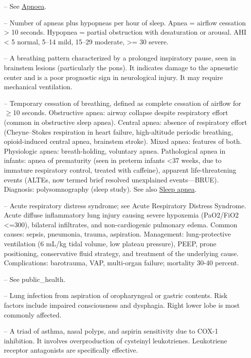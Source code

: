 -- See \hyperlink{Apnoea}{Apnoea}.

-- Number of apneas plus hypopneas per hour of sleep. Apnea = airflow cessation > 10 seconds. Hypopnea = partial obstruction with desaturation or arousal. AHI < 5 normal, 5--14 mild, 15--29 moderate, >= 30 severe.

-- A breathing pattern characterized by a prolonged inspiratory pause, seen in brainstem lesions (particularly the pons). It indicates damage to the apneustic center and is a poor prognostic sign in neurological injury. It may require mechanical ventilation.

-- Temporary cessation of breathing, defined as complete cessation of airflow for \(\ge\)10 seconds. Obstructive apnea: airway collapse despite respiratory effort (common in obstructive sleep apnea). Central apnea: absence of respiratory effort (Cheyne–Stokes respiration in heart failure, high-altitude periodic breathing, opioid-induced central apnea, brainstem stroke). Mixed apnea: features of both. Physiologic apnea: breath-holding, voluntary apnea. Pathological apnea in infants: apnea of prematurity (seen in preterm infants <37 weeks, due to immature respiratory control, treated with caffeine), apparent life-threatening events (ALTEs, now termed brief resolved unexplained events—BRUE). Diagnosis: polysomnography (sleep study). See also \hyperlink{Sleep Apnea}{Sleep apnea}.

-- Acute respiratory distress syndrome; see Acute Respiratory Distress Syndrome. Acute diffuse inflammatory lung injury causing severe hypoxemia (PaO2/FiO2 <=300), bilateral infiltrates, and non-cardiogenic pulmonary edema. Common causes: sepsis, pneumonia, trauma, aspiration. Management: lung-protective ventilation (6 mL/kg tidal volume, low plateau pressure), PEEP, prone positioning, conservative fluid strategy, and treatment of the underlying cause. Complications: barotrauma, VAP, multi-organ failure; mortality 30-40 percent.

-- See public\_health.

-- Lung infection from aspiration of oropharyngeal or gastric contents. Risk factors include impaired consciousness and dysphagia. Right lower lobe is most commonly affected.

-- A triad of asthma, nasal polyps, and aspirin sensitivity due to COX-1 inhibition. It involves overproduction of cysteinyl leukotrienes. Leukotriene receptor antagonists are specifically effective.

